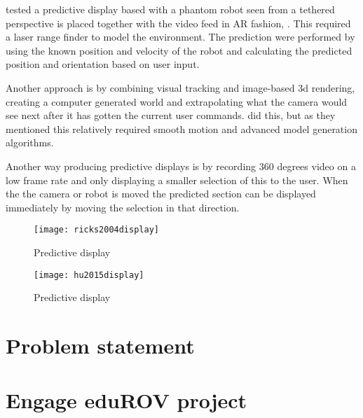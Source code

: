 \citep{Ricks2004} tested a predictive display based with a phantom robot seen from a tethered perspective is placed together with the video feed in AR fashion, . This required a laser range finder to model the environment. The prediction were performed by using the known position and velocity of the robot and calculating the predicted position and orientation based on user input.

Another approach is by combining visual tracking and image-based 3d rendering, creating a computer generated world and extrapolating what the camera would see next after it has gotten the current user commands. \citep{Hu2015} did this, but as they mentioned this relatively required smooth motion and advanced model generation algorithms.

Another way producing predictive displays is by recording 360 degrees video on a low frame rate and only displaying a smaller selection of this to the user. When the the camera or robot is moved the predicted section can be displayed immediately by moving the selection in that direction. \citep{Baldwin1999}

\begin{figure}[h!]
    \centering
    \texttt{[image: ricks2004display]}
    \caption{Predictive display \citep{Ricks2004}}
    \label{figRicks2004}
\end{figure}

\begin{figure}[h!]
    \centering
    \texttt{[image: hu2015display]}
    \caption{Predictive display \citep{Hu2015}}
\end{figure}

\section{Problem statement}

\section{Engage eduROV project}